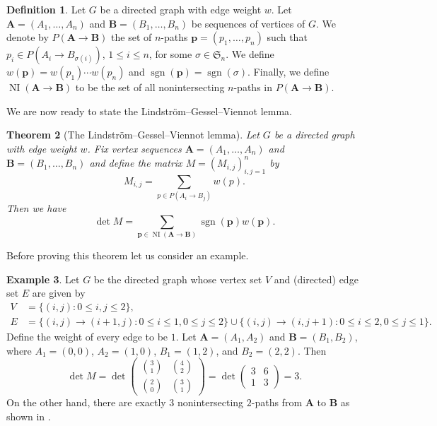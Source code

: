 \documentclass[oneside]{book}
\numberwithin{equation}{section}
\newtheorem{thm}{Theorem}[section]
\theoremstyle{definition}
\newtheorem{exam}[thm]{Example}
\newtheorem{defn}[thm]{Definition}
\newcommand\NI{\operatorname{NI}}
\newcommand\sgn{\operatorname{sgn}}
\newcommand\sym{\mathfrak{S}}
\renewcommand\vec[1]{\bm{#1}}
\begin{document}
\begin{defn}\label{def:4}
  Let \( G \) be a directed graph with edge weight \( w \). Let
  \( \vec{A} = (A_1,\dots,A_n) \) and \( \vec B = (B_1,\dots,B_n) \)
  be sequences of vertices of \( G \). We denote by
  \( P(\vec A\to \vec B) \) the set of \( n \)-paths
  \( \vec p = (p_1,\dots,p_n) \) such that
  \( p_i\in P(A_i\to B_{\sigma(i)}) \), \( 1\le i\le n \), for some
  \( \sigma\in \sym_n \). We define
  \( w(\vec p) = w(p_1) \cdots w(p_n) \) and
  \( \sgn(\vec p)= \sgn(\sigma) \). Finally, we define
  \( \NI(\vec A\to \vec B) \) to be the set of all nonintersecting
  \( n \)-paths in \( P(\vec A\to \vec B) \).
\end{defn}

We are now ready to state the Lindstr\"om--Gessel--Viennot lemma.

\begin{thm}[The Lindstr\"om--Gessel--Viennot lemma]\label{thm:LGV}
  Let \( G \) be a directed graph with edge weight \( w \). Fix vertex
  sequences \( \vec A = (A_1,\dots,A_n) \) and
  \( \vec B = (B_1,\dots,B_n) \) and define the matrix
  \( M = (M_{i,j})_{i,j=1}^n \) by
\[
  M_{i,j} = \sum_{p\in P(A_i\to B_j)} w(p).
\]
Then we have
\[
  \det M = \sum_{\vec p \in \NI(\vec A \to \vec B)} \sgn(\vec p) w(\vec p).
\]
\end{thm}

Before proving this theorem let us consider an example.

\begin{exam}
  Let \( G \) be the directed graph whose vertex set \( V \)
  and (directed) edge set \( E \) are given by
  \begin{align*}
    V &= \{(i,j): 0\le i,j\le 2\},\\
    E &= \{(i,j)\to (i+1,j): 0\le i\le 1, 0\le j\le 2\}
        \cup \{(i,j)\to (i,j+1): 0\le i\le 2, 0\le j\le 1\}.
  \end{align*}
  Define the weight of every edge to be \( 1 \). Let
  \( \vec A = (A_1,A_2) \) and \( \vec B = (B_1,B_2) \), where
  \( A_1 = (0,0) \), \( A_2 = (1,0) \), \( B_1 = (1,2) \), and
  \( B_2 = (2,2) \). Then
  \[
  \det  M =
    \det \begin{pmatrix}
\binom{3}{1} & \binom{4}{2}\\[4pt]
\binom{2}{0} & \binom{3}{1}
\end{pmatrix}
= \det \begin{pmatrix}
3 & 6\\
1 & 3
\end{pmatrix} = 3.
  \]
  On the other hand, there are exactly \( 3 \) nonintersecting
  \( 2 \)-paths from \( \vec A \) to \( \vec B \) as shown in
  .
\end{exam}
\end{document}
